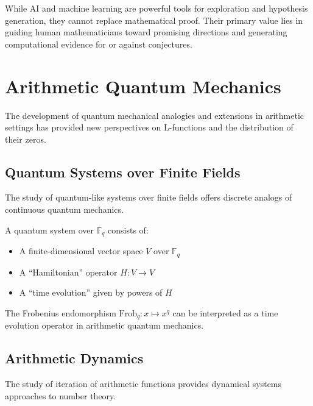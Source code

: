 \begin{philosophical}
While AI and machine learning are powerful tools for exploration and hypothesis generation, they cannot replace mathematical proof. Their primary value lies in guiding human mathematicians toward promising directions and generating computational evidence for or against conjectures.
\end{philosophical}

\section{Arithmetic Quantum Mechanics}
\label{sec:arithmetic_quantum}

The development of quantum mechanical analogies and extensions in arithmetic settings has provided new perspectives on L-functions and the distribution of their zeros.

\subsection{Quantum Systems over Finite Fields}

The study of quantum-like systems over finite fields offers discrete analogs of continuous quantum mechanics.

\begin{definition}
\label{def:finite_field_quantum}
A quantum system over $\mathbb{F}_q$ consists of:
\begin{itemize}
\item A finite-dimensional vector space $V$ over $\mathbb{F}_q$
\item A ``Hamiltonian'' operator $H: V \to V$
\item A ``time evolution'' given by powers of $H$
\end{itemize}
\end{definition}

\begin{theorem}
\label{thm:frobenius_time}
The Frobenius endomorphism $\text{Frob}_q: x \mapsto x^q$ can be interpreted as a time evolution operator in arithmetic quantum mechanics.
\end{theorem}

\subsection{Arithmetic Dynamics}

The study of iteration of arithmetic functions provides dynamical systems approaches to number theory.

